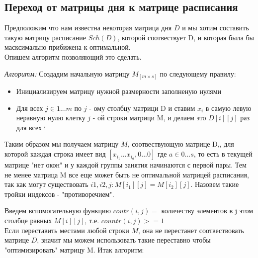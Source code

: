 \documentclass{article}
\begin{document}
\subsection{Переход от  матрицы дня к матрице расписания}
Предположим что нам известна некоторая матрица дня \(D\) и мы хотим составить такую матрицу расписание \(Sch(D)\), которой соотвествует D, и которая была бы масксимально прибижена к оптимальной.
\\Опишем алгоритм позволяющий это сделать.
\par
\textit{Алгоритм:} Создадим начальную матрицу \(M_{[m \times s]}\) по следующему правилу: \\
\begin{itemize}
\item  Инициализируем матрицу нужной размерности
   заполненую нулями 
\item Для всех \(j \in 1...m\) по \(j\) - ому столбцу матрици D и  ставим \(x_i\) в самую левую неравную нулю клетку \(j\) - ой строки матрици M, и делаем это \( D[i][j]\)
раз для всех i
\end{itemize}
Таким образом мы получаем матрицу \(M\), соотвествующую матрице D,, для которой каждая строка имеет вид \([x_{i_1} ... x_{i_a}, 0 ... 0]\) где \( a \in 0...s\), то есть в текущей матрице "нет окон" и  у каждой группы занятия начинаются с первой пары. Тем не менее матрица M все еще может быть не оптимальной матрицей расписания, так как могут существовать  \( i1, i2, j: M[i_1][j] = M[i_2][j]\). Назовем такие тройки индексов - "противоречием".  
\par
Введем вспомогательную функцию \(coutr(i, j) = \) количеству элементов в j этом столбце равных \(M[i][j]\), т.е. \(countr(i, j) >= 1 \) \\ 
Если переставить местами любой строки \(M\), она не перестанет соотвествовать матрице \(D\), значит мы можем использовать такие переставно чтобы "оптимизировать" матрицу M. Итак алгоритм:
\end{document}
